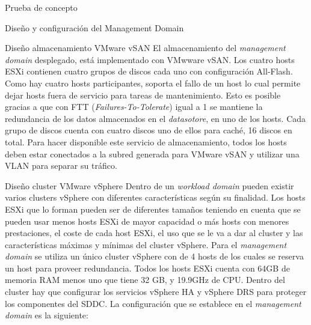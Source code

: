 \begin{section}{Prueba de concepto}
\begin{subsection}{Diseño y configuración del Management Domain}
    
    \begin{subsubsection}{Diseño almacenamiento VMware vSAN}
      El almacenamiento del \textit{management domain} desplegado, está implementado con VMwware vSAN. Los cuatro hosts ESXi contienen cuatro grupos de discos cada uno con configuración All-Flash. Como hay cuatro hosts participantes, soporta el fallo de un host lo cual permite dejar hosts fuera de servicio para tareas de mantenimiento. Esto es posible gracias a que con FTT (\textit{Failures-To-Tolerate}) igual a 1 se mantiene la redundancia de los datos almacenados en el \textit{datasotore}, en uno de los hosts. Cada grupo de discos cuenta con cuatro discos uno de ellos para caché, 16 discos en total. Para hacer disponible este servicio de almacenamiento, todos los hosts deben estar conectados a la subred generada para VMware vSAN y utilizar una VLAN para separar su tráfico.
    \end{subsubsection}
        
    \begin{subsubsection}{Diseño cluster VMware vSphere}
    Dentro de un \textit{workload domain} pueden existir varios clusters vSphere con diferentes características según su finalidad. Los hosts ESXi que lo forman pueden ser de diferentes tamaños teniendo en cuenta que se pueden usar menos hosts ESXi de mayor capacidad o más hosts con menores prestaciones, el coste de cada host ESXi, el uso que se le va a dar al cluster y las características máximas y mínimas del cluster vSphere. Para el \textit{management domain} se utiliza un único cluster vSphere con de 4 hosts de los cuales se reserva un host para proveer redundancia. Todos los hosts ESXi cuenta con 64GB de memoria RAM menos uno que tiene 32 GB, y 19.9GHz de CPU. Dentro del cluster hay que configurar los servicios vSphere HA y vSphere DRS para proteger los componentes del SDDC. La configuración que se establece en el \textit{management domain} es la siguiente:
   

\end{subsubsection}
\end{subsection}
\end{section}
